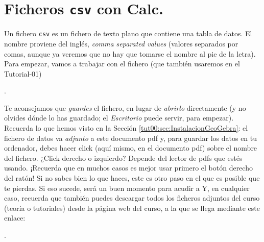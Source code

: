 \documentclass[10pt,a4paper]{article}\usepackage[]{graphicx}\usepackage[]{color}
\newcounter {cont01}
\begin{document}
\section{Ficheros {\tt csv} con Calc.}
\label{tut00:sec:FicherosCsvConCalc}

Un fichero {\tt csv} es un fichero de texto plano que contiene una tabla de datos. El nombre
proviene del inglés, {\em comma separated values} (valores separados por comas, aunque ya veremos
que no hay que tomarse el nombre al pie de la letra).  Para empezar, vamos a trabajar con el
fichero (que también usaremos en el Tutorial-01)
\begin{center}
.
\end{center}
Te aconsejamos que {\em guardes} el fichero, en lugar de {\em abrirlo} directamente (y no olvides
dónde lo has guardado; el {\em Escritorio} puede servir, para empezar). Recuerda lo que hemos
visto en la Sección \ref{tut00:sec:InstalacionGeoGebra}: el fichero de datos va {\em adjunto} a
este documento pdf y, para guardar los datos en tu ordenador, debes hacer click (aquí mismo, en el
documento pdf) sobre el nombre del fichero. ¿Click derecho o izquierdo? Depende del lector de pdfs
que estés usando. ¡Recuerda que en muchos casos es mejor usar primero el botón derecho del ratón!
Si no sabes bien lo que haces, este es otro paso en el que es posible que te pierdas. Si eso
sucede, será un buen momento para acudir a  Y, en cualquier caso, recuerda
que también puedes descargar todos los ficheros adjuntos del curso (teoría o tutoriales) desde la
página web del curso, a la que se llega mediante este enlace:
\begin{center}
.
\end{center}
\end{document}

